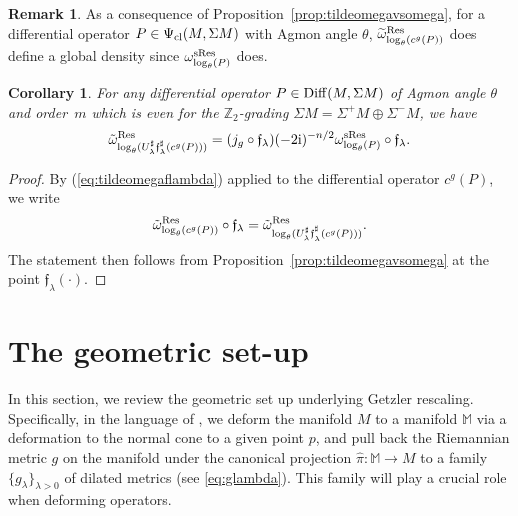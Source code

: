 \documentclass[10pt,a4paper]{amsart}
\numberwithin{equation}{section}
\newtheorem{cor}[thm]{Corollary}
\theoremstyle{definition}
\newtheorem{rk}[thm]{Remark}
\newcommand{\Z}{\mathbb Z}
\newcommand{\M}{\mathbb M}
\begin{document}
\begin{rk}%
As a consequence of Proposition~\ref{prop:tildeomegavsomega}, for a differential operator $P\in \Psi_{\rm cl}(M, \Sigma M)$ with Agmon angle $\theta$, $\widetilde \omega^{\rm Res}_{\log_\theta (c^g(P))}$ does define a global density since $\omega^{\rm sRes}_{\log_\theta (P)}$ does.
\end{rk}

\begin{cor}\label{cor:relationomegatilde}
For any differential operator $P\in {\rm Diff}(M,\Sigma M)$ of Agmon angle $\theta$ and order~$m$ which is even for the $\Z_2$-grading $\Sigma M=\Sigma^+ M\oplus \Sigma^- M$, we have
\[\tilde \omega^{{\rm Res}}_{ \log _\theta (U_\lambda^\sharp {\mathfrak f}_{ \lambda}^\sharp ( c^g(P)))}=(j_g\circ {\mathfrak f}_{\lambda}) (-2{\rm i})^{-n/2}\omega^{ {\rm sRes}}_{\log _\theta (P)}\circ \mathfrak{f}_\lambda.\]
\end{cor}

\begin{proof} By (\ref{eq:tildeomegaflambda}) applied to the differential operator $c^g(P)$, we write
\begin{equation*}
		\tilde \omega^{\rm Res}_{\log _\theta (c^g(P))}\circ {\mathfrak f}_{ \lambda} = \tilde \omega^{ {\rm Res}}_{{ \log _\theta (U_\lambda^\sharp {\mathfrak f}}_{ \lambda}^\sharp ( c^g(P)))}.
 \end{equation*}
The statement then follows from Proposition~\ref{prop:tildeomegavsomega} at the point $\mathfrak{f}_\lambda(\cdot)$.
\end{proof}

\section{The geometric set-up} %
In this section, we review the geometric set up underlying Getzler rescaling. Specifically, in the language of \cite[Section~1.1]{DS1},
we deform the manifold $M$ to a manifold $\M$ via a deformation to the normal cone to a given point $p$, and pull back the Riemannian metric $g$ on the manifold under the canonical projection $\hat \pi\colon \M\to M$ to a family $\{g_\lambda\}_{\lambda>0}$ of dilated metrics (see \eqref{eq:glambda}). This family will play a crucial role when deforming operators.
\end{document}
